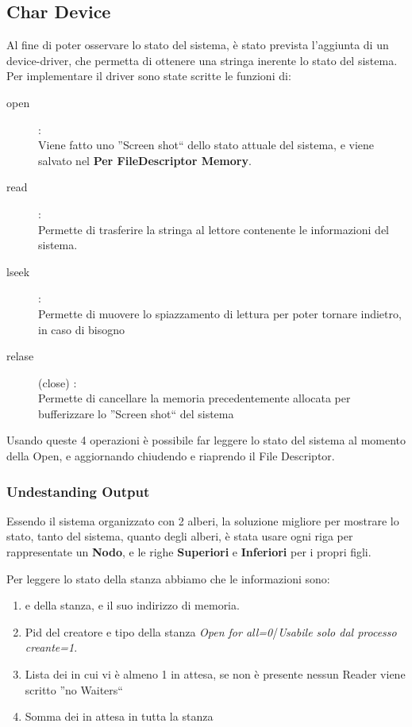 \newpage

\subsection{Char Device} \label{CharDevice}

Al fine di poter osservare lo stato del sistema, è stato prevista l'aggiunta di un device-driver, che permetta di
ottenere una stringa inerente lo stato del sistema.
Per implementare il driver sono state scritte le funzioni di:
\begin{description}
 \item[open] :\\
 Viene fatto uno ''Screen shot`` dello stato attuale del sistema, e viene salvato nel \textbf{Per FileDescriptor
Memory}.
 \item[read] :\\
 Permette di trasferire la stringa al lettore contenente le informazioni del sistema.
 \item[lseek] :\\
 Permette di muovere lo spiazzamento di lettura per poter tornare indietro, in caso di bisogno
 \item[relase] (close) :\\
 Permette di cancellare la memoria precedentemente allocata per bufferizzare lo ''Screen shot`` del sistema
\end{description}


Usando queste 4 operazioni è possibile far leggere lo stato del sistema al momento della Open, e aggiornando chiudendo
e riaprendo il File Descriptor.

\subsubsection{Undestanding Output}

Essendo il sistema organizzato con 2 alberi, la soluzione migliore per mostrare lo stato, tanto del sistema, quanto
degli alberi, è stata usare ogni riga per rappresentate un \textbf{Nodo}, e le righe \textbf{Superiori} e
\textbf{Inferiori} per i propri figli.

Per leggere lo stato della stanza abbiamo che le informazioni sono:
\begin{enumerate}
 \item \tagSys e \keySys della stanza, e il suo indirizzo di memoria.
 \item Pid del creatore e tipo della stanza \textit{Open for all=0}/\textit{Usabile solo dal processo creante=1}.
 \item Lista dei \Topic in cui vi è almeno 1 \Reader in attesa, se non è presente nessun Reader viene scritto ''no
Waiters``
 \item Somma dei \Reader in attesa in tutta la stanza
\end{enumerate}


